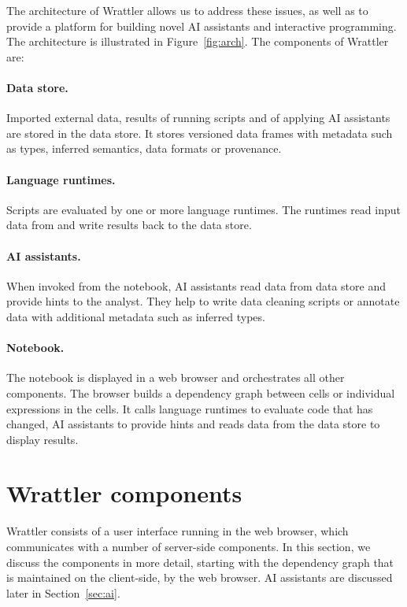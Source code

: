 \documentclass[sigplan,preprint,10pt]{acmart}\settopmatter{printfolios=true,printccs=false,printacmref=false}
\begin{document}
The architecture of Wrattler allows us to address these issues, as well as to provide a platform
for building novel AI assistants and interactive programming. The architecture is illustrated
in Figure~\ref{fig:arch}. The components of Wrattler are:

\vspace{-0.25em}
\paragraph{Data store.} Imported external data, results of running scripts and of
applying AI assistants are stored in the data store. It stores versioned data frames with
metadata such as types, inferred semantics, data formats or provenance.

\vspace{-0.25em}
\paragraph{Language runtimes.} Scripts are evaluated by one or more language runtimes.
The runtimes read input data from and write results back to the data store.

\vspace{-0.25em}
\paragraph{AI assistants.} When invoked from the notebook, AI assistants read data
from data store and provide hints to the analyst. They help to write data cleaning
scripts or annotate data with additional metadata such as inferred types.

\vspace{-0.25em}
\paragraph{Notebook.} The notebook is displayed in a web browser and orchestrates
all other components. The browser builds a dependency graph between cells or individual
expressions in the cells. It calls language runtimes to evaluate code that has changed,
AI assistants to provide hints and reads data from the data store to display results.

\section{Wrattler components}
\label{sec:wrattler}

Wrattler consists of a user interface running in the web browser, which communicates with
a number of server-side components. In this section, we discuss the components in more 
detail, starting with the dependency graph that is maintained on the client-side, by the 
web browser. AI assistants are discussed later in Section~\ref{sec:ai}.
\end{document}
